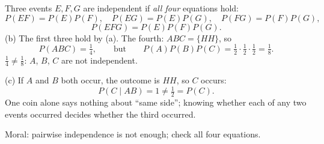 \begin{slides}
	\small
	Three events $E,F,G$ are \alert{independent} if \emph{all four}
	equations hold:
	\[ P(EF)=P(E)P(F),\quad P(EG)=P(E)P(G),\quad P(FG)=P(F)P(G), \]
	\[ P(EFG)=P(E)P(F)P(G). \]
	\pause
	(b) The first three hold by (a). The fourth: $ABC=\{HH\}$, so
	\[ P(ABC)=\tfrac14, \qquad\text{but}\qquad
		P(A)P(B)P(C)=\tfrac12\cdot\tfrac12\cdot\tfrac12=\tfrac18. \]
	\pause
	$\tfrac14\ne\tfrac18$: $A$, $B$, $C$ are \alert{not independent}.
	\pause

	\medskip
	(c) If $A$ and $B$ both occur, the outcome is $HH$, so $C$ occurs:
	\[ P(C\mid AB)=1\ne\tfrac12=P(C). \]
	\pause
	One coin alone says nothing about ``same side''; knowing whether each
	of any two events occurred decides whether the third occurred.
	\pause

	\medskip
	\alert{Moral:} pairwise independence is not enough; check all four
	equations.
\end{slides}

